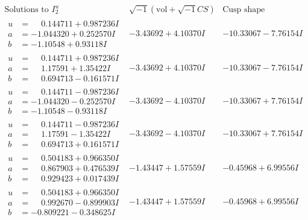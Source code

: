 \documentclass[1p]{elsarticle_modified}
\theoremstyle{definition}
\newcommand{\I}{\sqrt{-1}}
\begin{document}
$$\begin{array}{c|c|c}  
\text{Solutions to }I^u_{2}& \I (\text{vol} + \sqrt{-1}CS) & \text{Cusp shape}\\
 \hline 
\begin{aligned}
u &= \phantom{-}0.144711 + 0.987236 I \\
a &= -1.044320 + 0.252570 I \\
b &= -1.10548 + 0.93118 I\end{aligned}
 & -3.43692 + 4.10370 I & -10.33067 - 7.76154 I \\ \hline\begin{aligned}
u &= \phantom{-}0.144711 + 0.987236 I \\
a &= \phantom{-}1.17591 + 1.35422 I \\
b &= \phantom{-}0.694713 - 0.161571 I\end{aligned}
 & -3.43692 + 4.10370 I & -10.33067 - 7.76154 I \\ \hline\begin{aligned}
u &= \phantom{-}0.144711 - 0.987236 I \\
a &= -1.044320 - 0.252570 I \\
b &= -1.10548 - 0.93118 I\end{aligned}
 & -3.43692 - 4.10370 I & -10.33067 + 7.76154 I \\ \hline\begin{aligned}
u &= \phantom{-}0.144711 - 0.987236 I \\
a &= \phantom{-}1.17591 - 1.35422 I \\
b &= \phantom{-}0.694713 + 0.161571 I\end{aligned}
 & -3.43692 - 4.10370 I & -10.33067 + 7.76154 I \\ \hline\begin{aligned}
u &= \phantom{-}0.504183 + 0.966350 I \\
a &= \phantom{-}0.867903 + 0.476539 I \\
b &= \phantom{-}0.929423 + 0.017439 I\end{aligned}
 & -1.43447 + 1.57559 I & -0.45968 + 6.99556 I \\ \hline\begin{aligned}
u &= \phantom{-}0.504183 + 0.966350 I \\
a &= \phantom{-}0.992670 - 0.899903 I \\
b &= -0.809221 - 0.348625 I\end{aligned}
 & -1.43447 + 1.57559 I & -0.45968 + 6.99556 I \\ \hline\begin{aligned}

\end{aligned}
\end{array}$$
\end{document}
